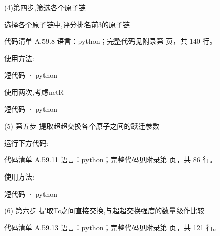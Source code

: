 \documentclass[lang=cn,scheme=chinese,color=blue,device=normal,toc=onecol,math=cm]{elegantbook}
\begin{document}
(4)第四步,筛选各个原子链\par


选择各个原子链中,评分排名前3的原子链\par


\begin{codeindexbox}{代码清单 A.59.8}
语言：python；完整代码见附录第 \pageref{code:59:8} 页，共 140 行。
\end{codeindexbox}


使用方法:\par


\begin{inlinecodebox}{短代码 · python}
\end{inlinecodebox}


使用两次,考虑netR\par


\begin{inlinecodebox}{短代码 · python}
\end{inlinecodebox}


(5) 第五步 提取超超交换各个原子之间的跃迁参数\par


运行下方代码:\par


\begin{codeindexbox}{代码清单 A.59.11}
语言：python；完整代码见附录第 \pageref{code:59:11} 页，共 86 行。
\end{codeindexbox}


使用方法:\par


\begin{inlinecodebox}{短代码 · python}
\end{inlinecodebox}


(6) 第六步 提取Tc之间直接交换,与超超交换强度的数量级作比较\par


\begin{codeindexbox}{代码清单 A.59.13}
语言：python；完整代码见附录第 \pageref{code:59:13} 页，共 121 行。
\end{codeindexbox}
\end{document}
